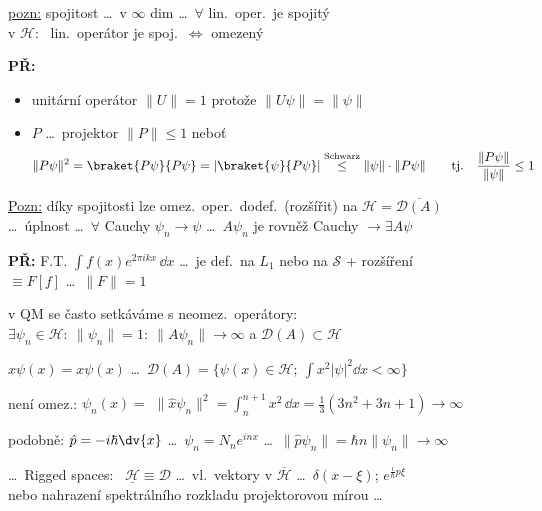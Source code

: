 \underline{pozn:} spojitost \dots\ v $\infty$ dim \dots\ $\forall$ lin.\ oper.\ je spojitý \\
\quad v $\mathcal{H}$: \ lin.\ operátor je spoj.\ $\Leftrightarrow$ omezený

\textbf{PŘ:}
\begin{itemize}[nosep]
  \item unitární operátor \quad $\|U\| = 1$ \quad protože $\|U\psi\| = \|\psi\|$
  \item $P$ \dots\ projektor \quad $\|P\|\leq 1$ \quad neboť
  \[
    \|P\psi\|^2 = \braket{P\psi}{P\psi} = |\braket{\psi}{P\psi}| \overset{\text{Schwarz}}{\leq} \|\psi\|\cdot\|P\psi\| \qquad\text{tj.}\quad \frac{\|P\psi\|}{\|\psi\|}\leq 1
  \]
\end{itemize}

\underline{Pozn:} díky spojitosti lze omez.\ oper.\ dodef.\ (rozšířit) na $\mathcal{H} = \overline{\mathcal{D}(A)}$ \\
\quad \dots\ úplnost \dots\ $\forall$ Cauchy $\psi_n\to\psi$ \dots\ $A\psi_n$ je rovněž Cauchy $\to\exists A\psi$

\textbf{PŘ:} F.T. \quad $\int f(x)e^{2\pi ikx}\,\dd x$ \dots\ je def.\ na $L_1$ nebo na $\mathcal{S}$ + rozšíření \\
\quad $\equiv F[f]$ \quad \dots\ $\|F\| = 1$

 v QM se často setkáváme s neomez.\ operátory: \\
\quad $\exists\psi_n\in\mathcal{H}:\ \|\psi_n\| = 1:\ \|A\psi_n\|\to\infty$ \quad a \quad $\mathcal{D}(A)\subset\mathcal{H}$

\begin{priklad}[PŘ]
$\hat x\psi(x) = x\psi(x)$ \quad \dots\ $\mathcal{D}(A) = \big\{\psi(x)\in\mathcal{H};\ \int x^2|\psi|^2\dd x < \infty\big\}$

není omez.: \quad $\psi_n(x) = $
\quad $\|\hat x\psi_n\|^2 = \int_n^{n+1}x^2\,\dd x = \frac13(3n^2 + 3n + 1)\to\infty$

podobně: \quad $\hat p = -i\hbar\dv{x}$ \quad \dots\ $\psi_n = N_ne^{inx}$ \quad \dots\ $\|\hat p\psi_n\| = \hbar n\|\psi_n\|\to\infty$
\end{priklad}

\dots\ Rigged spaces: \ $\underline{\mathcal{H}}\equiv\mathcal{D}$ \dots\ vl.\ vektory v $\overline{\mathcal{H}}$ \dots\ $\delta(x - \xi)$; $e^{\frac{i}{\hbar}p\xi}$ \\
\quad nebo nahrazení spektrálního rozkladu projektorovou mírou \dots

